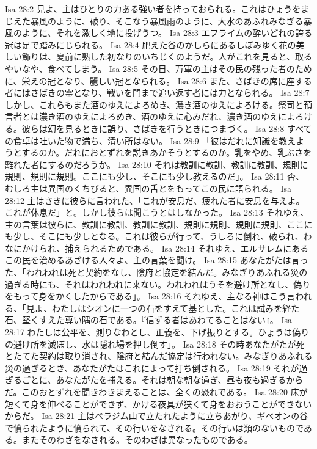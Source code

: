 Isa 28:2  見よ、主はひとりの力ある強い者を持っておられる。これはひょうをまじえた暴風のように、破り、そこなう暴風雨のように、大水のあふれみなぎる暴風のように、それを激しく地に投げうつ。
Isa 28:3  エフライムの酔いどれの誇る冠は足で踏みにじられる。
Isa 28:4  肥えた谷のかしらにあるしぼみゆく花の美しい飾りは、夏前に熟した初なりのいちじくのようだ。人がこれを見ると、取るやいなや、食べてしまう。
Isa 28:5  その日、万軍の主はその民の残った者のために、栄えの冠となり、麗しい冠となられる。
Isa 28:6  また、さばきの席に座する者にはさばきの霊となり、戦いを門まで追い返す者には力となられる。
Isa 28:7  しかし、これらもまた酒のゆえによろめき、濃き酒のゆえによろける。祭司と預言者とは濃き酒のゆえによろめき、酒のゆえに心みだれ、濃き酒のゆえによろける。彼らは幻を見るときに誤り、さばきを行うときにつまづく。
Isa 28:8  すべての食卓は吐いた物で満ち、清い所はない。
Isa 28:9  「彼はだれに知識を教えようとするのか。だれにおとずれを説きあかそうとするのか。乳をやめ、乳ぶさを離れた者にするのだろうか。
Isa 28:10  それは教訓に教訓、教訓に教訓、規則に規則、規則に規則。ここにも少し、そこにも少し教えるのだ」。
Isa 28:11  否、むしろ主は異国のくちびると、異国の舌とをもってこの民に語られる。
Isa 28:12  主はさきに彼らに言われた、「これが安息だ、疲れた者に安息を与えよ。これが休息だ」と。しかし彼らは聞こうとはしなかった。
Isa 28:13  それゆえ、主の言葉は彼らに、教訓に教訓、教訓に教訓、規則に規則、規則に規則、ここにも少し、そこにも少しとなる。これは彼らが行って、うしろに倒れ、破られ、わなにかけられ、捕えられるためである。
Isa 28:14  それゆえ、エルサレムにあるこの民を治めるあざける人々よ、主の言葉を聞け。
Isa 28:15  あなたがたは言った、「われわれは死と契約をなし、陰府と協定を結んだ。みなぎりあふれる災の過ぎる時にも、それはわれわれに来ない。われわれはうそを避け所となし、偽りをもって身をかくしたからである」。
Isa 28:16  それゆえ、主なる神はこう言われる、「見よ、わたしはシオンに一つの石をすえて基とした。これは試みを経た石、堅くすえた尊い隅の石である。『信ずる者はあわてることはない』。
Isa 28:17  わたしは公平を、測りなわとし、正義を、下げ振りとする。ひょうは偽りの避け所を滅ぼし、水は隠れ場を押し倒す」。
Isa 28:18  その時あなたがたが死とたてた契約は取り消され、陰府と結んだ協定は行われない。みなぎりあふれる災の過ぎるとき、あなたがたはこれによって打ち倒される。
Isa 28:19  それが過ぎるごとに、あなたがたを捕える。それは朝な朝な過ぎ、昼も夜も過ぎるからだ。このおとずれを聞きわきまえることは、全くの恐れである。
Isa 28:20  床が短くて身を伸べることができず、かける夜具が狭くて身をおおうことができないからだ。
Isa 28:21  主はペラジム山で立たれたように立ちあがり、ギベオンの谷で憤られたように憤られて、その行いをなされる。その行いは類のないものである。またそのわざをなされる。そのわざは異なったものである。
